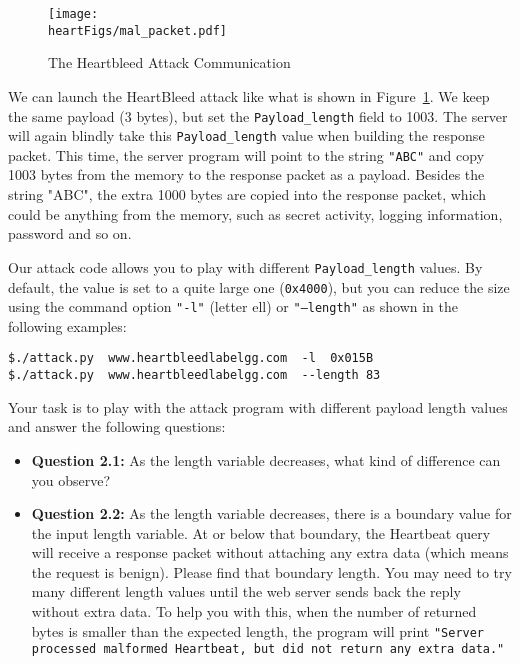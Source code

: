 \begin{figure}[!htb]
\centering
\texttt{[image: \\heartFigs/mal\_packet.pdf]}
\caption{The Heartbleed Attack Communication} 
\label{fig:mal_packet}
\end{figure}

We can launch the HeartBleed attack like what is shown in
Figure~\ref{fig:mal_packet}. We keep the same payload (3 bytes), but set
the \texttt{Payload\_length} field to 1003. The
server will again blindly take this \texttt{Payload\_length} value when building the response packet. This
time, the server program will point to the string \texttt{"ABC"} and copy 1003 bytes from the memory to
the response packet as a payload.  Besides the string "ABC", the extra 1000 bytes are copied
into the response packet, which could be anything from the memory, such as secret activity,
logging information, password and so on.



Our attack code allows
you to play with different \texttt{Payload\_length} values. By default, the
value is set to a quite large one (\texttt{0x4000}), but you can
reduce the size using the command option \texttt{"-l"} (letter ell)
or \texttt{"--length"} as shown in the following examples: 

\begin{lstlisting}
$./attack.py  www.heartbleedlabelgg.com  -l  0x015B 
$./attack.py  www.heartbleedlabelgg.com	 --length 83
\end{lstlisting}
 

Your task is to play with the attack program with different payload length
values and answer the
following questions:


\begin{itemize}
  \item {\bf Question 2.1:} As the length variable decreases, what kind of difference can you observe?

  \item {\bf Question 2.2:} As the length variable decreases, there is a boundary value for the input length
    variable.  At or below that boundary, the Heartbeat query will receive
    a response packet
    without attaching any extra data (which means the request is benign). Please find that
    boundary length.  You may need to try many
    different length values until the web server sends back the reply
    without extra data.  To help you with this, when the number of returned bytes is smaller
    than the expected length, the program will print \texttt{"Server processed malformed
    Heartbeat, but did not return any extra data."}
\end{itemize}




